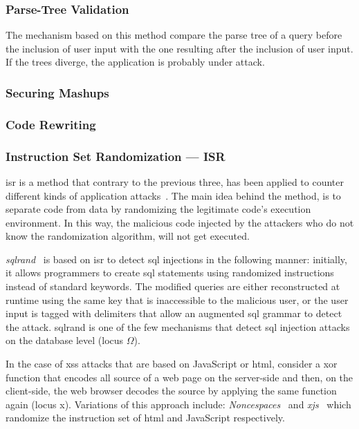 \documentclass[conference]{IEEEtran}
\begin{document}
\subsubsection{Parse-Tree Validation}

The mechanism based on this method compare the parse tree of a
query before the inclusion of user input with the one resulting after
the inclusion of user input. If the trees diverge, the application
is probably under attack.

\subsubsection{Securing Mashups}

\subsubsection{Code Rewriting}

\subsubsection{Instruction Set Randomization --- ISR}

{\sc isr} is a method that contrary to the previous
three, has been applied to counter
different kinds of application attacks~\cite{K09b,KKP03}.
The main idea behind the method, is to
separate code from data by randomizing the legitimate code's 
execution environment. In this way, the malicious code
injected by the attackers who do not know the randomization
algorithm, will not get executed.

{\it {\sc sql}rand}~\cite{BK04} is based on {\sc isr}
to detect {\sc sql} injections in the following manner:
initially, it allows programmers to create {\sc sql} statements
using randomized instructions instead of standard keywords.
The modified queries are either reconstructed at runtime using
the same key that is inaccessible to the malicious user,
or the user input is tagged with delimiters that allow
an augmented {\sc sql} grammar to detect the
attack. {\sc sql}rand is one of the few mechanisms that
detect {\sc sql} injection attacks on the database
level (locus $\Omega$).

In the case of {\sc xss} attacks that are based on JavaScript
or {\sc html}, consider a {\sc xor} function that encodes all source of a web
page on the server-side and then, on the client-side, the web browser decodes the
source by applying the same function again (locus {\sc x}).
Variations of this approach include:
{\it Noncespaces}~\cite{GC09} and {\it x{\sc js}}~\cite{APKLM10}
which randomize the instruction set of {\sc html} and
JavaScript respectively.
\end{document}
